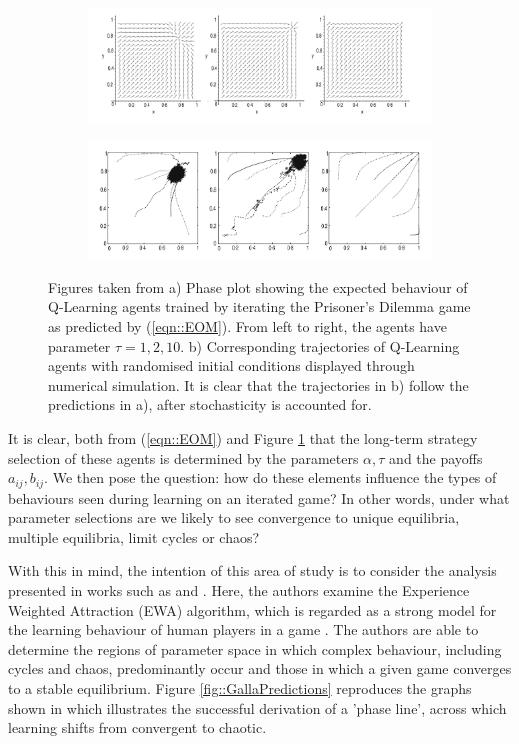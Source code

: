 \documentclass[.../main.tex]{subfiles}
\begin{document}
	\begin{figure}[h]
		\centering
		\begin{subfigure}[b]{0.9 \textwidth}
			\centering
			\includegraphics[width=0.75 \textwidth]{Figures/Dynamics}
			\caption{}
		\end{subfigure}
		
		\begin{subfigure}[b]{0.9 \textwidth}
			\centering
			\includegraphics[width=0.7 \textwidth]{Figures/Q-Learners}
			\caption{}
		\end{subfigure}

		\caption{ \label{fig::TuylsExperiments} Figures taken from \cite{Tuyls2006AnGames} a) Phase
		plot showing the expected behaviour of Q-Learning agents trained by iterating the
		Prisoner's Dilemma game as predicted by (\ref{eqn::EOM}). From left to right, the agents
		have parameter $\tau = 1, 2, 10$. b) Corresponding trajectories of Q-Learning agents with
		randomised initial conditions displayed through numerical simulation. It is clear that the
		trajectories in b) follow the predictions in a), after stochasticity is accounted for. }
	\end{figure}	

	It is clear, both from (\ref{eqn::EOM}) and Figure \ref{fig::TuylsExperiments} that the long-term strategy selection of
	these agents is determined by the parameters $\alpha, \tau$ and the payoffs $a_{ij}, b_{ij}$. We
	then pose the question: how do these elements influence the types of behaviours seen during
	learning on an iterated game? In other words, under what parameter selections are we likely to
	see convergence to unique equilibria, multiple equilibria, limit cycles or chaos?

	With this in mind, the intention of this area of study is to consider the analysis presented in
	works such as \cite{Sanders2018} and \cite{Galla2011}. Here, the authors examine the
	Experience Weighted Attraction (EWA) algorithm, which is regarded as a strong model for the
	learning behaviour of human players in a game \cite{Camerer2009}. The authors are able to
	determine the regions of parameter space in which complex behaviour,
	including cycles and chaos, predominantly occur and those in which a given game converges to a
	stable equilibrium. Figure \ref{fig::GallaPredictions} reproduces the graphs shown in \cite{Sanders2018} which
	illustrates the successful derivation of a 'phase line', across which learning shifts from
	convergent to chaotic.
\end{document}
